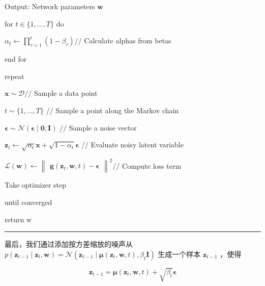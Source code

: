 \documentclass[10pt]{report}
\newcommand{\HRule}{\begin{center}\rule{0.9\linewidth}{0.2mm}\end{center}}
\begin{document}
\hspace*{1em} Output: Network parameters \(\mathbf{w}\)

\hspace*{1em} for \(t \in  \{ 1,\ldots ,T\}\) do

\hspace*{2em} \({\alpha }_{t} \leftarrow  \mathop{\prod }\limits_{{\tau  = 1}}^{t}\left( {1 - {\beta }_{\tau }}\right) //\) Calculate alphas from betas

\hspace*{1em} end for

\hspace*{1em} repeat

\hspace*{2em} \(\mathbf{x} \sim  \mathcal{D}//\) Sample a data point

\hspace*{2em} \(t \sim  \{ 1,\ldots ,T\}\) // Sample a point along the Markov chain

\hspace*{2em} \(\mathbf{\epsilon } \sim  \mathcal{N}\left( {\mathbf{\epsilon } \mid  \mathbf{0},\mathbf{I}}\right)\) // Sample a noise vector

\hspace*{2em} \({\mathbf{z}}_{t} \leftarrow  \sqrt{{\alpha }_{t}}\mathbf{x} + \sqrt{1 - {\alpha }_{t}}\mathbf{\epsilon }\) // Evaluate noisy latent variable

\hspace*{2em} \(\mathcal{L}\left( \mathbf{w}\right)  \leftarrow  {\begin{Vmatrix}\mathbf{g}\left( {\mathbf{z}}_{t},\mathbf{w},t\right)  - \mathbf{\epsilon }\end{Vmatrix}}^{2}//\) Compute loss term

\hspace*{2em} Take optimizer step

\hspace*{1em} until converged

\hspace*{1em} return \(\mathrm{w}\)

\HRule

最后，我们通过添加按方差缩放的噪声从 \(p\left( {{\mathbf{z}}_{t - 1} \mid  {\mathbf{z}}_{t},\mathbf{w}}\right)  = \mathcal{N}\left( {{\mathbf{z}}_{t - 1} \mid  \mathbf{\mu }\left( {{\mathbf{z}}_{t},\mathbf{w},t}\right) ,{\beta }_{t}\mathbf{I}}\right)\) 生成一个样本 \({\mathbf{z}}_{t - 1}\) ，使得

\[
{\mathbf{z}}_{t - 1} = \mathbf{\mu }\left( {{\mathbf{z}}_{t},\mathbf{w},t}\right)  + \sqrt{{\beta }_{t}}\mathbf{\epsilon } \tag{20.41}
\]
\end{document}

